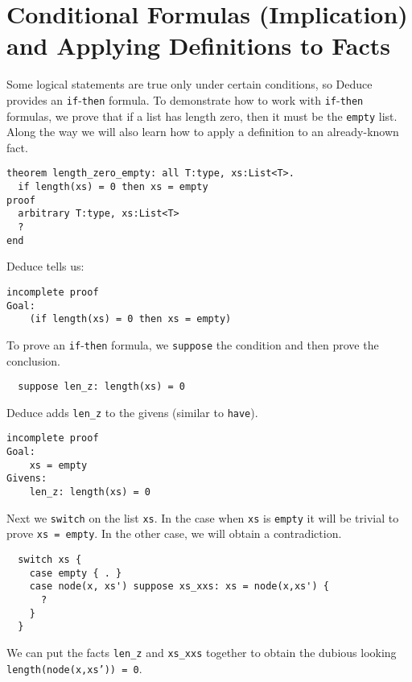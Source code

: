\documentclass[12pt]{article}
\begin{document}
\section{Conditional Formulas (Implication) and Applying Definitions to Facts}
\label{sec:implication}

Some logical statements are true only under certain conditions, so
Deduce provides an \texttt{if}-\texttt{then} formula.  To demonstrate
how to work with \texttt{if}-\texttt{then} formulas, we prove that if
a list has length zero, then it must be the \texttt{empty} list. Along
the way we will also learn how to apply a definition to an
already-known fact.

\begin{verbatim}
theorem length_zero_empty: all T:type, xs:List<T>.
  if length(xs) = 0 then xs = empty
proof
  arbitrary T:type, xs:List<T>
  ?
end
\end{verbatim}

\noindent Deduce tells us:

\begin{verbatim}
incomplete proof
Goal:
	(if length(xs) = 0 then xs = empty)
\end{verbatim}

To prove an \texttt{if}-\texttt{then} formula, we \texttt{suppose} the
condition and then prove the conclusion.

\begin{verbatim}
  suppose len_z: length(xs) = 0
\end{verbatim}

Deduce adds \texttt{len\_z} to the givens (similar to \texttt{have}).

\begin{verbatim}
incomplete proof
Goal:
	xs = empty
Givens:
	len_z: length(xs) = 0
\end{verbatim}

Next we \texttt{switch} on the list \texttt{xs}. In the case when
\texttt{xs} is \texttt{empty} it will be trivial to prove \texttt{xs =
  empty}. In the other case, we will obtain a contradiction.

\begin{verbatim}
  switch xs {
    case empty { . }
    case node(x, xs') suppose xs_xxs: xs = node(x,xs') {
      ?
    }
  }
\end{verbatim}

We can put the facts \texttt{len\_z} and \texttt{xs\_xxs} together
to obtain the dubious looking \texttt{length(node(x,xs')) = 0}.
\end{document}
